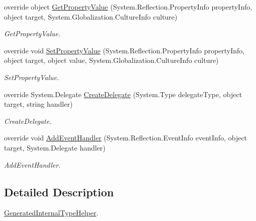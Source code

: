 \begin{DoxyCompactItemize}
override object \hyperlink{class_xaml_generated_namespace_1_1_generated_internal_type_helper_afdc9fe15b56607d02082908d934480c6}{GetPropertyValue} (System.Reflection.PropertyInfo propertyInfo, object target, System.Globalization.CultureInfo culture)
\begin{DoxyCompactList}\small\item\em GetPropertyValue. \item\end{DoxyCompactList}\item 
override void \hyperlink{class_xaml_generated_namespace_1_1_generated_internal_type_helper_ade0f04c0f7b18dd5b170e071d5534d38}{SetPropertyValue} (System.Reflection.PropertyInfo propertyInfo, object target, object value, System.Globalization.CultureInfo culture)
\begin{DoxyCompactList}\small\item\em SetPropertyValue. \item\end{DoxyCompactList}\item 
override System.Delegate \hyperlink{class_xaml_generated_namespace_1_1_generated_internal_type_helper_a8ec4c37e82d9f4e867e9655f4eac3a78}{CreateDelegate} (System.Type delegateType, object target, string handler)
\begin{DoxyCompactList}\small\item\em CreateDelegate. \item\end{DoxyCompactList}\item 
override void \hyperlink{class_xaml_generated_namespace_1_1_generated_internal_type_helper_a73471f4a6d1ca4c4fceec9ad8610f0c8}{AddEventHandler} (System.Reflection.EventInfo eventInfo, object target, System.Delegate handler)
\begin{DoxyCompactList}\small\item\em AddEventHandler. \item\end{DoxyCompactList}\end{DoxyCompactItemize}


\subsection{Detailed Description}
\hyperlink{class_xaml_generated_namespace_1_1_generated_internal_type_helper}{GeneratedInternalTypeHelper}. 

